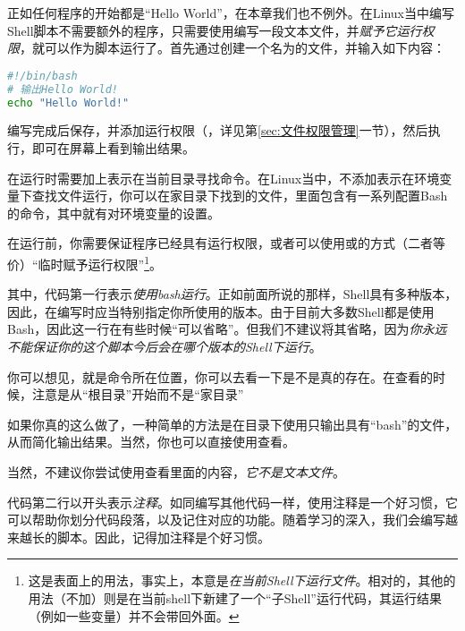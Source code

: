 正如任何程序的开始都是“Hello World”，在本章我们也不例外。在Linux当中编写Shell脚本不需要额外的程序，只需要使用编写一段文本文件，并\emph{赋予它运行权限}，就可以作为脚本运行了。首先通过创建一个名为的文件，并输入如下内容：

\begin{lstlisting}[language=bash,label=hello]
#!/bin/bash
# 输出Hello World!
echo "Hello World!"
\end{lstlisting}

编写完成后保存，并添加运行权限（，详见第\ref{sec:文件权限管理}一节），然后执行，即可在屏幕上看到输出结果。

\begin{attention}
    在运行时需要加上表示在当前目录寻找命令。在Linux当中，不添加表示在环境变量下查找文件运行，你可以在家目录下找到的文件，里面包含有一系列配置Bash的命令，其中就有对环境变量的设置。

    在运行前，你需要保证程序已经具有运行权限，或者可以使用或的方式（二者等价）“临时赋予运行权限”\footnote{这是表面上的用法，事实上，本意是\emph{在当前Shell下运行文件}。相对的，其他的用法（不加）则是在当前shell下新建了一个“子Shell”运行代码，其运行结果（例如一些变量）并不会带回外面。}。
\end{attention}

其中，代码第一行表示\emph{使用bash运行}。正如前面所说的那样，Shell具有多种版本，因此，在编写时应当特别指定你所使用的版本。由于目前大多数Shell都是使用Bash，因此这一行在有些时候“可以省略”。但我们不建议将其省略，因为\emph{你永远不能保证你的这个脚本今后会在哪个版本的Shell下运行}。

\begin{extend}
    你可以想见，就是命令所在位置，你可以去看一下是不是真的存在。在查看的时候，注意是从“根目录”开始而不是“家目录”

    如果你真的这么做了，一种简单的方法是在目录下使用只输出具有“bash”的文件，从而简化输出结果。当然，你也可以直接使用查看。

    当然，不建议你尝试使用查看里面的内容，\emph{它不是文本文件}。
\end{extend}

代码第二行以\code{\#}开头表示\emph{注释}。如同编写其他代码一样，使用注释是一个好习惯，它可以帮助你划分代码段落，以及记住对应的功能。随着学习的深入，我们会编写越来越长的脚本。因此，记得加注释是个好习惯。

